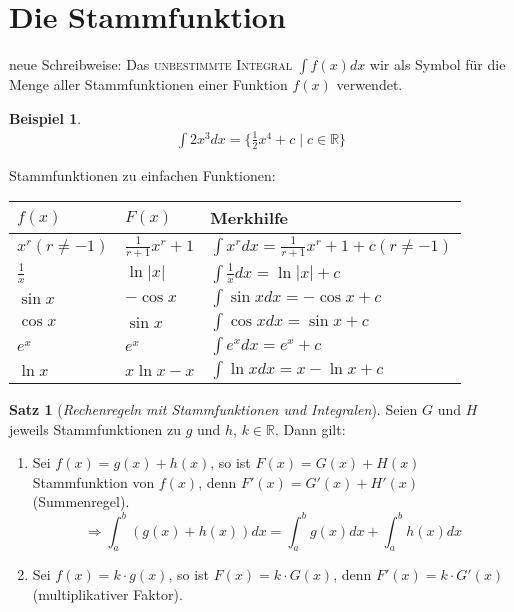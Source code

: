 \documentclass[a4paper,12pt,pointlessnumbers]{scrreprt}
\theoremstyle{definition}
\newtheorem{example}[definition]{Beispiel}
\newtheorem{Satz}[definition]{Satz}
\begin{document}
\section{Die Stammfunktion}
neue Schreibweise:
Das \textsc{unbestimmte Integral} $\int f(x) dx$ wir als Symbol für die Menge aller Stammfunktionen einer Funktion $f(x)$ verwendet.
\begin{example}
\begin{align*}
\int 2x^3 dx = \bigl\{ \frac{1}{2} x^4 +c \mid c \in \mathbb{R}\bigr\}
\end{align*}
\end{example}
Stammfunktionen zu einfachen Funktionen:
\begin{center}
    \begin{tabular}{| l | l | l |}
    \hline
    $f(x)$ & $F(x)$ & Merkhilfe \\ \hline
    $x^r (r\neq -1)$&$\frac{1}{r+1}x^r+1$&$\int x^r dx = \frac{1}{r+1}x^r+1 +c (r\neq -1)$     \\ \hline 
    $\frac{1}{x}$&$\ln|x|$& $\int\frac{1}{x}dx= \ln|x|+c$ \\ \hline
    $\sin x$ &$-\cos x$& $\int \sin x dx= -\cos x + c$ \\ \hline
    $\cos x$ & $\sin x$ & $\int \cos x dx= \sin x +c $ \\ \hline
    $e^x$ & $e^x$ & $\int e^x dx= e^x+c$ \\ \hline
    $\ln x$&$x\ln x -x$&$\int \ln x dx = x - \ln x +c$\\ \hline
    \end{tabular}
\end{center}
\begin{Satz}[\emph{Rechenregeln mit Stammfunktionen und Integralen}]
Seien $G$ und $H$ jeweils Stammfunktionen zu $g$ und $h$, $k\in \mathbb{R}$. Dann gilt:
\begin{enumerate}
\item Sei $f(x)=g(x)+h(x)$, so ist $F(x)=G(x)+H(x)$ Stammfunktion von $f(x)$, denn $F'(x)=G'(x)+H'(x)$ (Summenregel).
\[\Rightarrow \int_a^b (g(x)+h(x)) dx= \int_a^b g(x) dx + \int_a^b h(x) dx\]
\item Sei $f(x)=k \cdot g(x)$, so ist $F(x)=k\cdot G(x)$, denn $F'(x)=k\cdot G'(x)$ (multiplikativer Faktor).
\end{enumerate}
\end{Satz}
\end{document}
